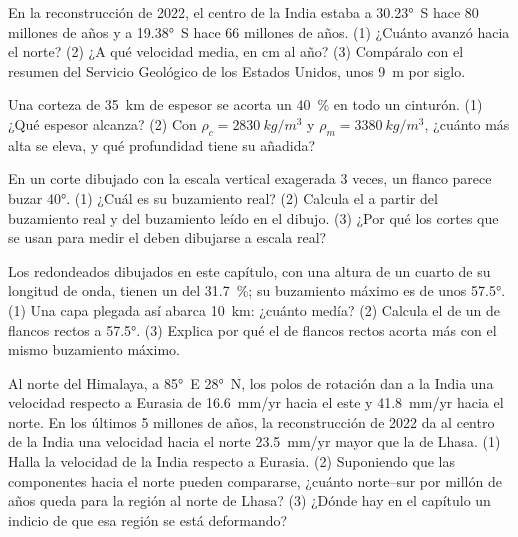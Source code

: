 \begin{exercise}[$\star\star$]\label{exo:g12:mountain-building:9}
En la reconstrucción de 2022, el centro de la India estaba a \ang{30.23}~S
hace 80 millones de años y a \ang{19.38}~S hace 66 millones de años. (1) ¿Cuánto
avanzó hacia el norte? (2) ¿A qué velocidad media, en \unit{cm} al año?
(3) Compáralo con el resumen del Servicio Geológico de los Estados Unidos,
unos \qty{9}{m} por siglo.
\end{exercise}

\begin{exercise}[$\star\star$]\label{exo:g12:mountain-building:10}
Una corteza de \qty{35}{km} de espesor se acorta un \qty{40}{\percent} en
todo un cinturón. (1) ¿Qué espesor alcanza? (2) Con $\rho_c =
\qty{2830}{kg/m^3}$ y $\rho_m = \qty{3380}{kg/m^3}$, ¿cuánto más alta se
eleva, y qué profundidad tiene su  añadida?
\end{exercise}

\begin{exercise}[$\star\star$]\label{exo:g12:mountain-building:11}
En un corte dibujado con la escala vertical exagerada 3 veces, un flanco
parece buzar \ang{40}. (1) ¿Cuál es su buzamiento real? (2) Calcula el
 a partir del buzamiento real y del buzamiento leído en el
dibujo. (3) ¿Por qué los cortes que se usan para medir el  deben
dibujarse a escala real?
\end{exercise}

\begin{exercise}[$\star\star\star$]\label{exo:g12:mountain-building:12}
Los  redondeados dibujados en este capítulo, con una altura de un
cuarto de su longitud de onda, tienen un  del
\qty{31.7}{\percent}; su buzamiento máximo es de unos \ang{57.5}. (1) Una
capa plegada así abarca \qty{10}{km}: ¿cuánto medía? (2) Calcula el
 de un  de flancos rectos a \ang{57.5}. (3) Explica por qué
el  de flancos rectos acorta más con el mismo buzamiento máximo.
\end{exercise}

\begin{exercise}[$\star\star\star$]\label{exo:g12:mountain-building:13}
Al norte del Himalaya, a \ang{85}~E \ang{28}~N, los polos de rotación dan a
la India una velocidad respecto a Eurasia de \qty{16.6}{mm/yr} hacia el este
y \qty{41.8}{mm/yr} hacia el norte. En los últimos 5 millones de años, la
reconstrucción de 2022 da al centro de la India una velocidad hacia el norte
\qty{23.5}{mm/yr} mayor que la de Lhasa. (1) Halla la velocidad de la India
respecto a Eurasia. (2) Suponiendo que las componentes hacia el norte pueden
compararse, ¿cuánto  norte--sur por millón de años queda para la
región al norte de Lhasa? (3) ¿Dónde hay en el capítulo un indicio de que esa
región se está deformando?
\end{exercise}

